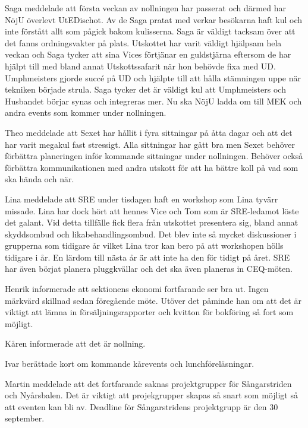 \documentclass[10pt]{article}
\begin{document}
\begin{paragrafer}
\begin{paragrafer}
Saga meddelade att första veckan av nollningen har passerat och därmed har NöjU överlevt UtEDischot. Av de Saga pratat med verkar besökarna haft kul och inte förstått allt som pågick bakom kulisserna. Saga är väldigt tacksam över att det fanns ordningsvakter på plats.
Utskottet har varit väldigt hjälpsam hela veckan och Saga tycker att sina Vices förtjänar en guldstjärna eftersom de har hjälpt till med bland annat Utskottssafarit när hon behövde fixa med UD. Umphmeisters gjorde succé på UD och hjälpte till att hålla stämningen uppe när tekniken började strula. Saga tycker det är väldigt kul att Umphmeisters och Husbandet börjar synas och integreras mer. Nu ska NöjU ladda om till MEK och andra events som kommer under nollningen. 

Theo meddelade att Sexet har hållit i fyra sittningar på åtta dagar och att det har varit megakul fast stressigt. Alla sittningar har gått bra men Sexet behöver förbättra planeringen inför kommande sittningar under nollningen. Behöver också förbättra kommunikationen med andra utskott för att ha bättre koll på vad som ska hända och när. 

Lina meddelade att SRE under tisdagen haft en workshop som Lina tyvärr missade. Lina har dock hört att hennes Vice och Tom som är SRE-ledamot löste det galant. Vid detta tillfälle fick flera från utskottet presentera sig, bland annat skyddsombud och likabehandlingsombud. 
Det blev inte så mycket diskussioner i grupperna som tidigare år vilket Lina tror kan bero på att workshopen hölls tidigare i år. En lärdom till nästa år är att inte ha den för tidigt på året. 
SRE har även börjat planera pluggkvällar och det ska även planeras in CEQ-möten. 



Henrik informerade att sektionens ekonomi fortfarande ser bra ut. Ingen märkvärd skillnad sedan föregående möte. Utöver det påminde han om att det är viktigt att lämna in försäljningsrapporter och kvitton för bokföring så fort som möjligt. 

 

Kåren informerade att det är nollning. 

Ivar berättade kort om kommande kårevents och lunchföreläsningar.

Martin meddelade att det fortfarande saknas projektgrupper för Sångarstriden och Nyårsbalen. Det är viktigt att projekgrupper skapas så snart som möjligt så att eventen kan bli av. Deadline för Sångarstridens projektgrupp är den 30 september. 


\end{paragrafer}
\end{paragrafer}
\end{document}
